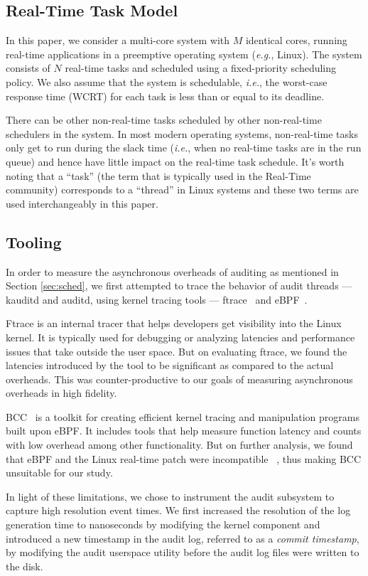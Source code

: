 \subsection{Real-Time Task Model}
In this paper, we consider a multi-core system with $M$ identical cores, running real-time applications in a preemptive operating system (\textit{e.g.}, Linux). 
The system consists of $N$ real-time tasks and scheduled using a fixed-priority scheduling policy. We also assume that the system is schedulable, \textit{i.e.}, the worst-case response time (WCRT) for each task is less than or equal to its deadline. 

There can be other non-real-time tasks scheduled by other non-real-time schedulers in the system. In most modern operating systems, non-real-time tasks only get to run during the slack time (\textit{i.e.}, when no real-time tasks are in the run queue) and hence have little impact on the real-time task schedule. It's worth noting that a ``task'' (the term that is typically used in the Real-Time community) corresponds to a ``thread'' in Linux systems and these two terms are used interchangeably in this paper.

\subsection{Tooling}
\label{sec:tooling}
In order to measure the asynchronous overheads of auditing as mentioned in Section \ref{sec:sched}, we first attempted to trace the behavior of audit threads — kauditd and auditd, using kernel tracing tools — ftrace~\cite{ftrace} and eBPF~\cite{ebpf}. 

Ftrace is an internal tracer that helps developers get visibility into the Linux kernel. It is typically used for debugging or analyzing latencies and performance issues that take outside the user space. But on evaluating ftrace, we found the latencies introduced by the tool to be significant as compared to the actual overheads. This was counter-productive to our goals of measuring asynchronous overheads in high fidelity.

BCC~\cite{bcc} is a toolkit for creating efficient kernel tracing and manipulation programs built upon eBPF. It includes tools that help measure function latency and counts with low overhead among other functionality. But on further analysis, we found that eBPF and the Linux real-time patch were incompatible ~\cite{bcc_rtlinux}, thus making BCC unsuitable for our study.

In light of these limitations, we chose to instrument the audit subsystem to capture high resolution event times. We first increased the resolution of the log generation time to nanoseconds by modifying the kernel component and introduced a new timestamp in the audit log, referred to as a \textit{commit timestamp}, by modifying the audit userspace utility before the audit log files were written to the disk. 

